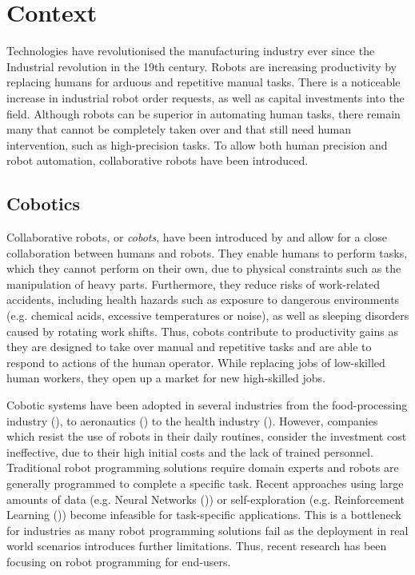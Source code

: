 \section{Context}
Technologies have revolutionised the manufacturing industry ever since the Industrial revolution in the 19th century.
Robots are increasing productivity by replacing humans for arduous and repetitive manual tasks.
There is a noticeable increase in industrial robot order requests, as well as capital investments into the field.
Although robots can be superior in automating human tasks, there remain many that cannot be completely taken over and that still need human intervention, such as high-precision tasks.
To allow both human precision and robot automation, collaborative robots have been introduced.

\subsection{Cobotics}\label{subsec:Cobotics}
Collaborative robots, or \textit{cobots}, have been introduced by \cite{colgate1999cobots} and allow for a close collaboration between humans and robots.
They enable humans to perform tasks, which they cannot perform on their own, due to physical constraints such as the manipulation of heavy parts.
Furthermore, they reduce risks of work-related accidents, including health hazards such as exposure to dangerous environments (e.g. chemical acids, excessive temperatures or noise), as well as sleeping disorders caused by rotating work shifts.
Thus, cobots contribute to productivity gains as they are designed to take over manual and repetitive tasks and are able to respond to actions of the human operator.
While replacing jobs of low-skilled human workers, they open up a market for new high-skilled jobs.

Cobotic systems have been adopted in several industries from the food-processing industry (\cite{Food}), to aeronautics (\cite{Airbus}) to the health industry (\cite{Ebola}).
However, companies which resist the use of robots in their daily routines, consider the investment cost ineffective, due to their high initial costs and the lack of trained personnel.
Traditional robot programming solutions require domain experts and robots are generally programmed to complete a specific task.
Recent approaches using large amounts of data (e.g. Neural Networks (\cite{billard2001robust})) or self-exploration (e.g. Reinforcement Learning (\cite{smart2002effective})) become infeasible for task-specific applications.
This is a bottleneck for industries as many robot programming solutions fail as the deployment in real world scenarios introduces further limitations. 
Thus, recent research has been focusing on robot programming for end-users.


